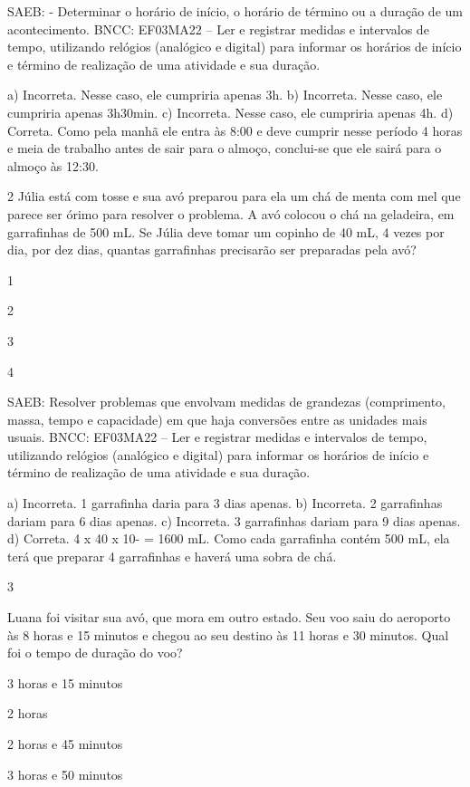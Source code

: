 \begin{escolha}
SAEB: - Determinar o horário de início, o horário de término ou a duração de um acontecimento. 
BNCC: EF03MA22 -- Ler e registrar medidas e intervalos de tempo, utilizando relógios (analógico e
digital) para informar os horários de início e término de realização de uma atividade e sua
duração.

a) Incorreta. Nesse caso, ele cumpriria apenas 3h.
b) Incorreta. Nesse caso, ele cumpriria apenas 3h30min.
c) Incorreta. Nesse caso, ele cumpriria apenas 4h.
d) Correta. Como pela manhã ele entra às 8:00 e deve cumprir nesse período 4 horas e
meia de trabalho antes de sair para o almoço, conclui-se que ele sairá para o almoço às 12:30.

\num{2} Júlia está com tosse e sua avó preparou para ela um chá de menta com mel que parece ser órimo para resolver o problema. A avó colocou o chá na geladeira, em garrafinhas de 500 mL. Se Júlia deve tomar um copinho de 40 mL, 4 vezes por dia, por dez dias, quantas garrafinhas precisarão ser preparadas pela avó?

\begin{escolha}

\item
  1
\item
  2
\item
  3
\item
  4
\end{escolha}

SAEB: Resolver problemas que envolvam medidas de grandezas (comprimento, massa, tempo e capacidade) em que haja conversões entre as unidades mais usuais. 
BNCC: EF03MA22 -- Ler e registrar medidas e intervalos de tempo, utilizando relógios (analógico e
digital) para informar os horários de início e término de realização de uma atividade e sua
duração.

a) Incorreta. 1 garrafinha daria para 3 dias apenas.
b) Incorreta. 2 garrafinhas dariam para 6 dias apenas.
c) Incorreta. 3 garrafinhas dariam para 9 dias apenas.
d) Correta. 4 x 40 x 10- = 1600 mL. Como cada garrafinha contém 500 mL, ela terá que
preparar 4 garrafinhas e haverá uma sobra de chá.

\num{3}

Luana foi visitar sua avó, que mora em outro estado. Seu voo
saiu do aeroporto às 8 horas e 15 minutos e chegou ao seu destino às 11
horas e 30 minutos. Qual foi o tempo de duração do voo?

\begin{escolha}

\item
  3 horas e 15 minutos
\item
  2 horas 
\item
  2 horas e 45 minutos
\item
  3 horas e 50 minutos
\end{escolha}


\end{escolha}
